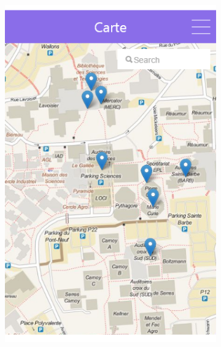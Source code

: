 \documentclass{eplmastersthesis}
\begin{document}
\begin{figure}[H]
\begin{subfigure}[b]{0.3\textwidth}
        \includegraphics[width=\textwidth]{Images/InVision/map.png}
    \end{subfigure}
    ~ %
    \begin{subfigure}[b]{0.3\textwidth}

\end{subfigure}
\end{figure}
\end{document}
